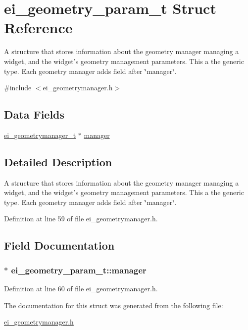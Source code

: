 \hypertarget{structei__geometry__param__t}{\section{ei\-\_\-geometry\-\_\-param\-\_\-t Struct Reference}
\label{structei__geometry__param__t}
}


A structure that stores information about the geometry manager managing a widget, and the widget's geometry management parameters. This a the generic type. Each geometry manager adds field after \char`\"{}manager\char`\"{}.  




{\ttfamily \#include $<$ei\-\_\-geometrymanager.\-h$>$}

\subsection*{Data Fields}
\begin{DoxyCompactItemize}
\item 
\hyperlink{structei__geometrymanager__t}{ei\-\_\-geometrymanager\-\_\-t} $\ast$ \hyperlink{structei__geometry__param__t_a635f77c11000dc23dc8e06256f0b5c0c}{manager}
\end{DoxyCompactItemize}


\subsection{Detailed Description}
A structure that stores information about the geometry manager managing a widget, and the widget's geometry management parameters. This a the generic type. Each geometry manager adds field after \char`\"{}manager\char`\"{}. 

Definition at line 59 of file ei\-\_\-geometrymanager.\-h.



\subsection{Field Documentation}
\hypertarget{structei__geometry__param__t_a635f77c11000dc23dc8e06256f0b5c0c}{
\subsubsection[{manager}]{$\ast$ ei\-\_\-geometry\-\_\-param\-\_\-t\-::manager}}\label{structei__geometry__param__t_a635f77c11000dc23dc8e06256f0b5c0c}


Definition at line 60 of file ei\-\_\-geometrymanager.\-h.



The documentation for this struct was generated from the following file\-:\begin{DoxyCompactItemize}
\item 
\hyperlink{ei__geometrymanager_8h}{ei\-\_\-geometrymanager.\-h}\end{DoxyCompactItemize}
